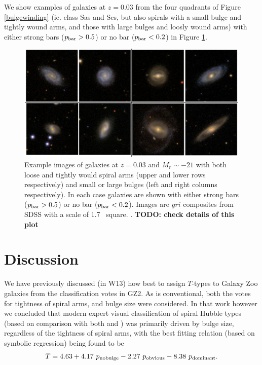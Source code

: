 \documentclass[usenatbib]{mn2e}
\newcommand{\be}{\begin{equation}}
\newcommand{\ee}{\end{equation}}
\begin{document}
 We show examples of galaxies at $z=0.03$ from the four quadrants of Figure \ref{bulgewinding} (ie. class Sas and Scs, but also spirals with a small bulge and tightly wound arms, and those with large bulges and loosly wound arms) with either strong bars ($p_{\rm bar}>0.5$) or no bar ($p_{\rm bar} < 0.2$) in Figure \ref{windingexample}. 
 
 \begin{figure}
\center
\includegraphics[width=160mm]{examplebulgewinding2.png}
\caption{Example images of galaxies at $z=0.03$ and $M_r\sim -21$ with both loose and tightly would spiral arms (upper and lower rows respectively) and small or large bulges (left and right columns respectively). In each case galaxies are shown with either strong bars ($p_{\rm bar}>0.5$) or no bar ($p_{\rm bar} < 0.2$). Images are $gri$ composites from SDSS with a scale of 1.7\arcmin~ square.  \label{windingexample}. {\bf TODO: check details of this plot}}
\end{figure}
 
\section{Discussion} \label{discussion}

 
 We have previously discussed (in W13) how best to assign $T$-types to Galaxy Zoo galaxies from the classification votes in GZ2. As is conventional, both the votes for tightness of spiral arms, and bulge size were considered. In that work however we concluded that modern expert visual classification of spiral Hubble types (based on comparison with both \citet[hereafter NA10]{Nair2010a} and \citet{EFIGI}) was primarily driven by bulge size, regardless of the tightness of spiral arms, with the best fitting relation (based on symbolic regression) being found to be
 \be
 T = 4.63 + 4.17~p_{\rm no bulge} - 2.27~p_{\rm obvious} - 8.38~p_{\rm dominant}. 
 \ee 
 
\end{document}

